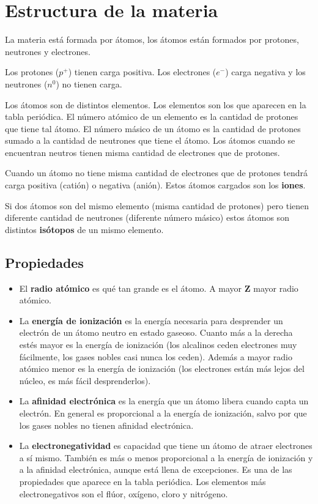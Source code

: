 \section{Estructura de la materia}

La materia está formada por átomos, los átomos están formados por protones, neutrones y electrones.

\sskip
Los protones ($p^+$) tienen carga positiva. Los electrones ($e^-$) carga negativa y los neutrones ($n^0$) no tienen carga.

\sskip
Los átomos son de distintos elementos. Los elementos son los que aparecen en la tabla periódica. El número atómico de un elemento es la cantidad de protones que tiene tal átomo. El número másico de un átomo es la cantidad de protones sumado a la cantidad de neutrones que tiene el átomo. Los átomos cuando se encuentran neutros tienen misma cantidad de electrones que de protones.

\sskip
Cuando un átomo no tiene misma cantidad de electrones que de protones tendrá carga positiva (catión) o negativa (anión). Estos átomos cargados son los \textbf{iones}.

\sskip
Si dos átomos son del mismo elemento (misma cantidad de protones) pero tienen diferente cantidad de neutrones (diferente número másico) estos átomos son distintos \textbf{isótopos} de un mismo elemento.

\subsection*{Propiedades}
\begin{itemize}
    \item El \textbf{radio atómico} es qué tan grande es el átomo. A mayor \textbf{Z} mayor radio atómico.
    \item La \textbf{energía de ionización} es la energía necesaria para desprender un electrón de un átomo neutro en estado gaseoso. Cuanto más a la derecha estés mayor es la energía de ionización (los alcalinos ceden electrones muy fácilmente, los gases nobles casi nunca los ceden). Además a mayor radio atómico menor es la energía de ionización (los electrones están más lejos del núcleo, es más fácil desprenderlos).
    \item La \textbf{afinidad electrónica} es la energía que un átomo libera cuando capta un electrón. En general es proporcional a la energía de ionización, salvo por que los gases nobles no tienen afinidad electrónica.
    \item La \textbf{electronegatividad} es capacidad que tiene un átomo de atraer electrones a sí mismo. También es más o menos proporcional a la energía de ionización y a la afinidad electrónica, aunque está llena de excepciones. Es una de las propiedades que aparece en la tabla periódica. Los elementos más electronegativos son el flúor, oxígeno, cloro y nitrógeno.
\end{itemize}

